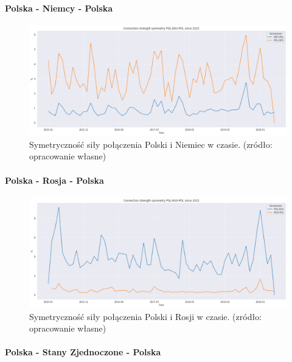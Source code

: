 \documentclass[11pt]{report}
\begin{document}
    \paragraph{Polska - Niemcy - Polska}

    \begin{figure}[ht]
        \centering
        \includegraphics[width=1 \textwidth]{fig/ConnectionSymmetry/POL-DEU-POL.png}
        \caption{Symetryczność siły połączenia Polski i Niemiec w czasie. (zródło: opracowanie własne)}
        \label{fig:POL-DEU-POL}
    \end{figure}

    \paragraph{Polska - Rosja - Polska}

    \begin{figure}[ht]
        \centering
        \includegraphics[width=1 \textwidth]{fig/ConnectionSymmetry/POL-RUS-POL.png}
        \caption{Symetryczność siły połączenia Polski i Rosji w czasie. (zródło: opracowanie własne)}
        \label{fig:POL-RUS-POL}
    \end{figure}

    \paragraph{Polska - Stany Zjednoczone - Polska}
\end{document}
